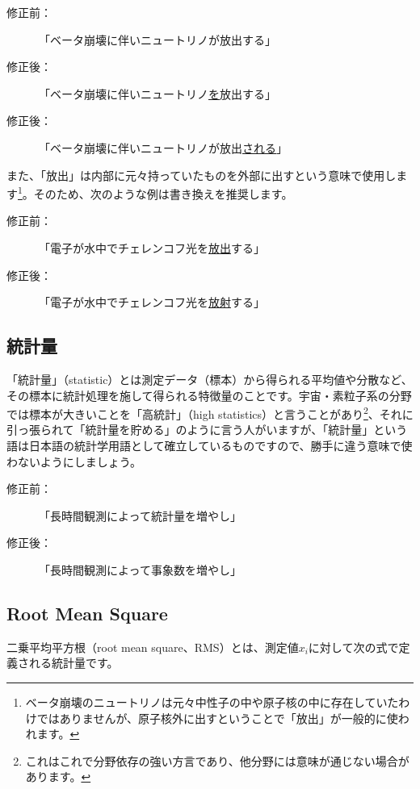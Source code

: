 \begin{description}
\item[修正前：]「ベータ崩壊に伴いニュートリノが放出する」
\item[修正後：]「ベータ崩壊に伴いニュートリノ\underline{を}放出する」
\item[修正後：]「ベータ崩壊に伴いニュートリノが放出\underline{される}」
\end{description}

また、「放出」は内部に元々持っていたものを外部に出すという意味で使用します\footnote{ベータ崩壊のニュートリノは元々中性子の中や原子核の中に存在していたわけではありませんが、原子核外に出すということで「放出」が一般的に使われます。}。そのため、次のような例は書き換えを推奨します。

\begin{description}
\item[修正前：]「電子が水中でチェレンコフ光を\underline{放出}する」
\item[修正後：]「電子が水中でチェレンコフ光を\underline{放射}する」
\end{description}

\subsection{統計量}

「統計量」（statistic）とは測定データ（標本）から得られる平均値や分散など、その標本に統計処理を施して得られる特徴量のことです。宇宙・素粒子系の分野では標本が大きいことを「高統計」（high statistics）と言うことがあり\footnote{これはこれで分野依存の強い方言であり、他分野には意味が通じない場合があります。}、それに引っ張られて「統計量を貯める」のように言う人がいますが、「統計量」という語は日本語の統計学用語として確立しているものですので、勝手に違う意味で使わないようにしましょう。

\begin{description}
\item[修正前：]「長時間観測によって統計量を増やし」
\item[修正後：]「長時間観測によって事象数を増やし」
\end{description}

\subsection{Root Mean Square}

二乗平均平方根（root mean square、RMS）とは、測定値$x_i$に対して次の式で定義される統計量です。

